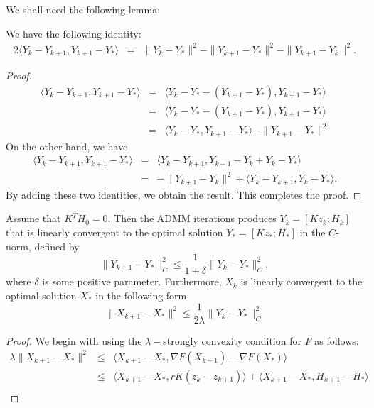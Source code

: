 \begin{itemize}
We shall need the following lemma: 
\begin{lemma}
We have the following identity:
\begin{eqnarray*}
2 \langle Y_{k} - Y_{k+1}, Y_{k+1} - Y_* \rangle &=& \|Y_{k} - Y_*\|^2 - \|Y_{k+1} - Y_* \|^2 - \|Y_{k+1} - Y_k\|^2. 
\end{eqnarray*} 
\end{lemma} 
\begin{proof} 

\begin{eqnarray*}
\langle Y_{k} - Y_{k+1}, Y_{k+1} - Y_* \rangle &=& \langle Y_{k} - Y_* - (Y_{k+1} - Y_*), Y_{k+1} - Y_* \rangle \\ 
&=& \langle Y_{k} - Y_* - (Y_{k+1} - Y_*), Y_{k+1} - Y_* \rangle \\
&=&  \langle Y_{k} - Y_*, Y_{k+1} - Y_* \rangle - \| Y_{k+1} - Y_* \|^2
\end{eqnarray*} 
On the other hand, we have 
\begin{eqnarray*}
\langle Y_{k} - Y_{k+1}, Y_{k+1} - Y_* \rangle &=& \langle Y_{k} - Y_{k+1}, Y_{k+1} - Y_k + Y_k - Y_* \rangle \\ 
&=& - \|Y_{k+1} - Y_{k}\|^2 + \langle Y_{k} - Y_{k+1}, Y_k - Y_* \rangle . 
\end{eqnarray*} 
By adding these two identities, we obtain the result. This completes the proof. 
\end{proof}
\begin{theorem}
Assume that $K^TH_0 = 0$. Then the ADMM iterations produces $Y_k = [Kz_k; H_k]$ that is linearly convergent to the optimal solution  $Y_* = [Kz_*; H_*]$ in the $C$-norm, defined by 
\begin{equation}
\|Y_{k+1} - Y_* \|^2_C \leq \frac{1}{1+\delta} \| Y_{k} - Y_*\|^2_C,
\end{equation}
where $\delta$ is some positive parameter. Furthermore, $X_k$ is linearly convergent to the optimal solution $X_*$ in the following form
\begin{equation}
\|X_{k+1} - X_* \|^2 \leq \frac{1}{2 \lambda} \|Y_{k} - Y_* \|^2_C
\end{equation}
\end{theorem}
\begin{proof}
We begin with using the $\lambda-$strongly convexity condition for $F$ as follows: 
\begin{eqnarray*}
\lambda \| X_{k+1} - X_* \|^2 &\leq& \langle X_{k+1} - X_*, \nabla F(X_{k+1}) - \nabla F(X_*)\rangle \\
&\leq& \langle X_{k+1} - X_*, r K(z_k - z_{k+1}) \rangle + \langle X_{k+1} - X_*, H_{k+1} - H_* \rangle \\

\end{eqnarray*}
\end{proof}
\end{itemize}
